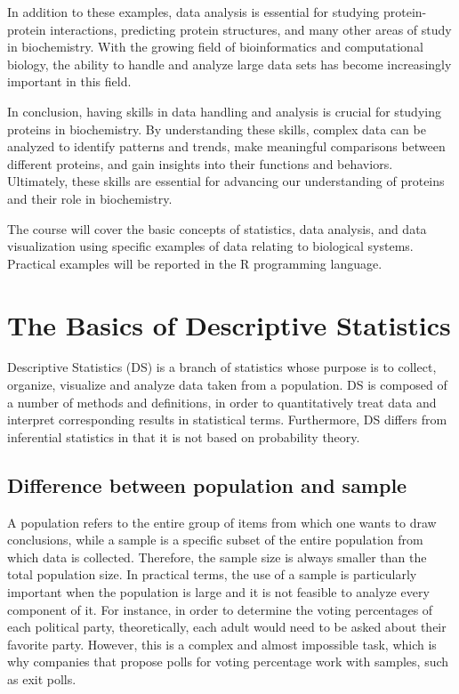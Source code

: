 \documentclass[
  letterpaper,
  DIV=11,
  numbers=noendperiod]{scrreprt}
\begin{document}
In addition to these examples, data analysis is essential for studying
protein-protein interactions, predicting protein structures, and many
other areas of study in biochemistry. With the growing field of
bioinformatics and computational biology, the ability to handle and
analyze large data sets has become increasingly important in this field.

In conclusion, having skills in data handling and analysis is crucial
for studying proteins in biochemistry. By understanding these skills,
complex data can be analyzed to identify patterns and trends, make
meaningful comparisons between different proteins, and gain insights
into their functions and behaviors. Ultimately, these skills are
essential for advancing our understanding of proteins and their role in
biochemistry.

The course will cover the basic concepts of statistics, data analysis,
and data visualization using specific examples of data relating to
biological systems. Practical examples will be reported in the R
programming language.


\hypertarget{the-basics-of-descriptive-statistics}{%
\chapter{The Basics of Descriptive
Statistics}\label{the-basics-of-descriptive-statistics}}

Descriptive Statistics (DS) is a branch of statistics whose purpose is
to collect, organize, visualize and analyze data taken from a
population. DS is composed of a number of methods and definitions, in
order to quantitatively treat data and interpret corresponding results
in statistical terms. Furthermore, DS differs from inferential
statistics in that it is not based on probability theory.

\hypertarget{difference-between-population-and-sample}{%
\section{Difference between population and
sample}\label{difference-between-population-and-sample}}

A population refers to the entire group of items from which one wants to
draw conclusions, while a sample is a specific subset of the entire
population from which data is collected. Therefore, the sample size is
always smaller than the total population size. In practical terms, the
use of a sample is particularly important when the population is large
and it is not feasible to analyze every component of it. For instance,
in order to determine the voting percentages of each political party,
theoretically, each adult would need to be asked about their favorite
party. However, this is a complex and almost impossible task, which is
why companies that propose polls for voting percentage work with
samples, such as exit polls.
\end{document}
